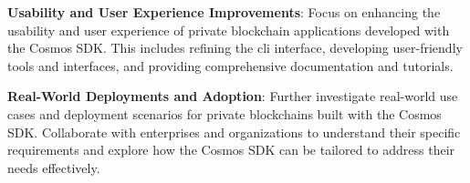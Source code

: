     \textbf{Usability and User Experience Improvements}: Focus on enhancing the usability and user experience of private blockchain applications developed with the Cosmos SDK. This includes refining the \gls{cli} interface, developing user-friendly tools and interfaces, and providing comprehensive documentation and tutorials.

    \textbf{Real-World Deployments and Adoption}: Further investigate real-world use cases and deployment scenarios for private blockchains built with the Cosmos SDK. Collaborate with enterprises and organizations to understand their specific requirements and explore how the Cosmos SDK can be tailored to address their needs effectively.

